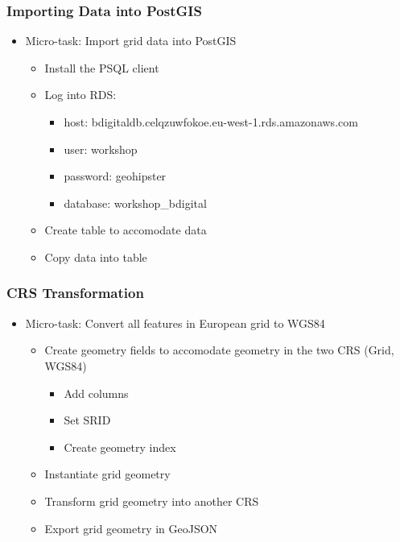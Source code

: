 \documentclass[hyperref={pdfpagelabels=true}]{beamer}
\begin{document}
\begin{frame}
\frametitle{Importing Data into PostGIS}
\begin{itemize}
  \item<1->Micro-task: Import grid data into PostGIS
  \begin{itemize}
    \item<2->Install the PSQL client
    \item<2->Log into RDS:
    \begin{itemize}    
      \item<3->host: bdigitaldb.celqzuwfokoe.eu-west-1.rds.amazonaws.com
      \item<3->user: workshop
      \item<3->password: geohipster
      \item<3->database: workshop\_bdigital      
    \end{itemize}
    \item<4->Create table to accomodate data
    \item<5->Copy data into table
  \end{itemize}
\end{itemize}
\end{frame}

\begin{frame}
\frametitle{CRS Transformation}
\begin{itemize}
  \item<1->Micro-task: Convert all features in European grid to WGS84
  \begin{itemize}
    \item<2->Create geometry fields to accomodate geometry in the two CRS (Grid, WGS84)
    \begin{itemize}    
      \item<3->Add columns
      \item<3->Set SRID
      \item<3->Create geometry index
    \end{itemize}
    \item<4->Instantiate grid geometry
    \item<5->Transform grid geometry into another CRS
    \item<6->Export grid geometry in GeoJSON
  \end{itemize}
\end{itemize}
\end{frame}
\end{document}
